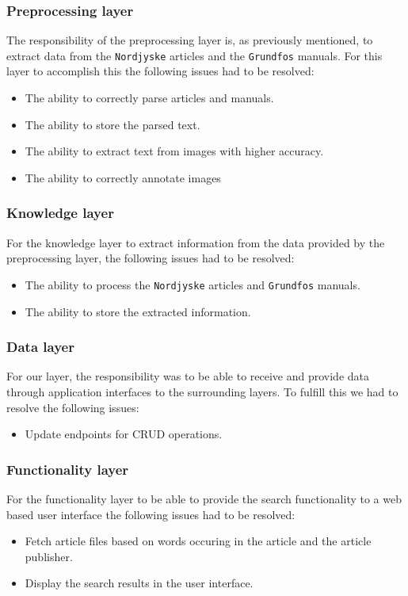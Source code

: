 
\subsubsection*{Preprocessing layer}
The responsibility of the preprocessing layer is, as previously mentioned, to extract data from the \texttt{Nordjyske} articles and the \texttt{Grundfos} manuals. For this layer to accomplish this the following issues had to be resolved:
\begin{itemize}
    \item The ability to correctly parse articles and manuals.
    \item The ability to store the parsed text.
    \item The ability to extract text from images with higher accuracy.
    \item The ability to correctly annotate images 
\end{itemize}

\subsubsection*{Knowledge layer}
For the knowledge layer to extract information from the data provided by the preprocessing layer, the following issues had to be resolved:
\begin{itemize}
    \item The ability to process the \texttt{Nordjyske} articles and \texttt{Grundfos} manuals.
    \item The ability to store the extracted information.
\end{itemize}

\subsubsection*{Data layer}
For our layer, the responsibility was to be able to receive and provide data through application interfaces to the surrounding layers. To fulfill this we had to resolve the following issues:
\begin{itemize}
    \item Update endpoints for CRUD operations.
\end{itemize}

\subsubsection*{Functionality layer}
For the functionality layer to be able to provide the search functionality to a web based user interface the following issues had to be resolved:
\begin{itemize}
    \item Fetch article files based on words occuring in the article and the article publisher.
    \item Display the search results in the user interface.
\end{itemize}
